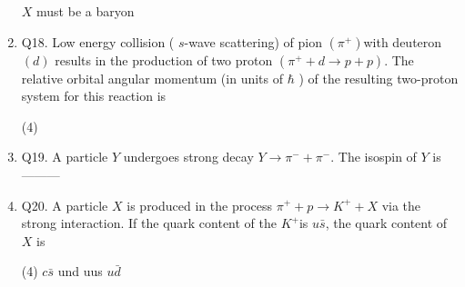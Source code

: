 \begin{enumerate}
\begin{tasks}
		\task[\textbf{d.}]$X$ must be a baryon 
	\end{tasks}
	\item Q18. Low energy collision ( $s$-wave scattering) of pion $\left(\pi^{+}\right)$with deuteron $(d)$ results in the production of two proton $\left(\pi^{+}+d \rightarrow p+p\right)$. The relative orbital angular momentum (in units of $\hbar$ ) of the resulting two-proton system for this reaction is
	{}
	 \begin{tasks}(4)
	\end{tasks}
	\item Q19. A particle $Y$ undergoes strong decay $Y \rightarrow \pi^{-}+\pi^{-}$. The isospin of $Y$ is---------
	{}
	\item Q20. A particle $X$ is produced in the process $\pi^{+}+p \rightarrow K^{+}+X$ via the strong interaction. If the quark content of the $K^{+}$is $u \bar{s}$, the quark content of $X$ is
{}
	 \begin{tasks}(4)
		\task[\textbf{a.}]$c \bar{s}$
		\task[\textbf{b.}]und
		\task[\textbf{c.}]uus
		\task[\textbf{d.}]$u \bar{d}$ 
	\end{tasks}
\end{enumerate}